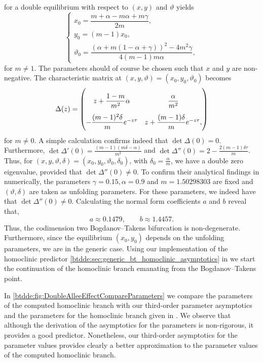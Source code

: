 for a double equilibrium with respect to $(x,y)$ and $\vartheta$ yields
\begin{equation}
    \begin{cases}
        x_0 = \dfrac{m+\alpha-m\alpha+m\gamma}{2m}, \\
        y_0 = (m-1)x_0, \\
        \vartheta_0 = \dfrac{(\alpha+m(1-\alpha+\gamma))^2 - 4m^2\gamma}{4(m-1)m\alpha},
    \end{cases}
\end{equation}
for $m\neq 1$. The parameters should of course be chosen such that $x$ and $y$
are non-negative. The characteristic matrix at
$(x,y,\vartheta)=(x_0,y_0,\vartheta_0)$ becomes
\[
\begingroup
\renewcommand*{\arraystretch}{2.5}
    \Delta(z) = \begin{pmatrix}
        z + \dfrac{1-m}{m^2}\alpha & \dfrac \alpha {m^2} \\
        -\dfrac{(m-1)^2\delta}m e^{-z\tau} & z + \dfrac{(m-1)\delta}m e^{-z\tau},
    \end{pmatrix}
\endgroup
\]
for $m\neq 0$. A simple calculation confirms indeed that $\det\Delta(0)=0$.
Furthermore, $\det\Delta'(0)=\frac{(m-1)(m\delta-\alpha)}{m^2}$ and
$\det\Delta''(0)=2 - \frac{2 (m-1) \delta\tau}{m}$. Thus, for
$(x,y,\vartheta,\delta)=(x_0,y_0,\vartheta_0,\delta_0)$, with $\delta_0 =
\frac\alpha m$, we have a double zero eigenvalue, provided that
$\det\Delta''(0) \neq 0$. To confirm their analytical findings in \cite{Jiao2021}
numerically, the parameters $\gamma=0.15,\alpha=0.9$ and $m=1.50298303$ are
fixed and $(\vartheta,\delta)$ are taken as unfolding parameters. For these
parameters, we indeed have that $\det\Delta''(0) \neq 0$. Calculating the normal
form coefficients $a$ and $b$ reveal that,
\[
a \approx 0.1479, \qquad b \approx 1.4457.
\]
Thus, the codimension two Bogdanov--Takens bifurcation is non-degenerate.
Furthermore, since the equilibrium $(x_0,y_0)$ depends on the unfolding
parameters, we are in the generic case. Using our implementation of the
homoclinic predictor \cref{btdde:sec:generic_bt_homoclinic_asymptotics} in
\DDEBIFTOOL we start the continuation of the homoclinic branch emanating from
the Bogdanov--Takens point.

In \cref{btdde:fig:DoubleAlleeEffectCompareParameters} we compare the parameters of
the computed homoclinic branch with our third-order parameter asymptotics and
the parameters for the homoclinic branch given in \cite{Jiao2021}. We observe
that although the derivation of the asymptotics for the parameters is
non-rigorous, it provides a good predictor. Nonetheless, our third-order
asymptotics for the parameter values provides clearly a better approximation to
the parameter values of the computed homoclinic branch.

